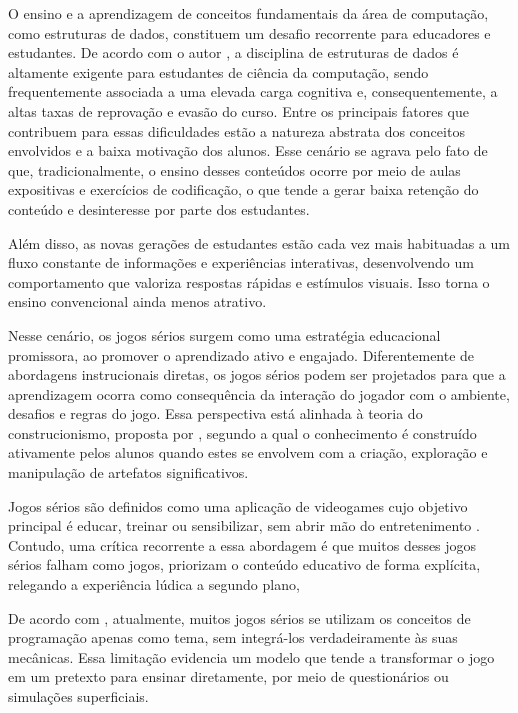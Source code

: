 O ensino e a aprendizagem de conceitos fundamentais da área de computação, como
estruturas de dados, constituem um desafio recorrente para educadores e
estudantes. De acordo com o autor \cite{mtaho2024difficulties}, a disciplina de
estruturas de dados é altamente exigente para estudantes de ciência da
computação, sendo frequentemente associada a uma elevada carga cognitiva e,
consequentemente, a altas taxas de reprovação e evasão do curso. Entre os
principais fatores que contribuem para essas dificuldades estão a natureza
abstrata dos conceitos envolvidos e a baixa motivação dos alunos. Esse cenário
se agrava pelo fato de que, tradicionalmente, o ensino desses conteúdos ocorre
por meio de aulas expositivas e exercícios de codificação, o que tende a gerar
baixa retenção do conteúdo e desinteresse por parte dos estudantes.

Além disso, as novas gerações de estudantes estão cada vez mais habituadas a um
fluxo constante de informações e experiências interativas, desenvolvendo um
comportamento que valoriza respostas rápidas e estímulos visuais. Isso torna o
ensino convencional ainda menos atrativo. 

Nesse cenário, os jogos sérios surgem como uma estratégia educacional
promissora, ao promover o aprendizado ativo e engajado. Diferentemente de
abordagens instrucionais diretas, os jogos sérios podem ser projetados para que
a aprendizagem ocorra como consequência da interação do jogador com o ambiente,
desafios e regras do jogo. Essa perspectiva está alinhada à teoria do
construcionismo, proposta por \cite{papert1993children}, segundo a qual o conhecimento é
construído ativamente pelos alunos quando estes se envolvem com a criação,
exploração e manipulação de artefatos significativos.

Jogos sérios são definidos como uma aplicação de videogames cujo objetivo
principal é educar, treinar ou sensibilizar, sem abrir mão do entretenimento
\cite{mouaheb2012serious}. Contudo, uma crítica recorrente a essa abordagem é
que muitos desses jogos sérios falham como jogos, priorizam o conteúdo educativo de
forma explícita, relegando a experiência lúdica a segundo plano, 

De acordo com \cite{de2025codebo}, atualmente, muitos jogos sérios se utilizam
os conceitos de programação apenas como tema, sem integrá-los verdadeiramente
às suas mecânicas. Essa limitação evidencia um modelo que tende a transformar o
jogo em um pretexto para ensinar diretamente, por meio de  questionários ou simulações superficiais.


